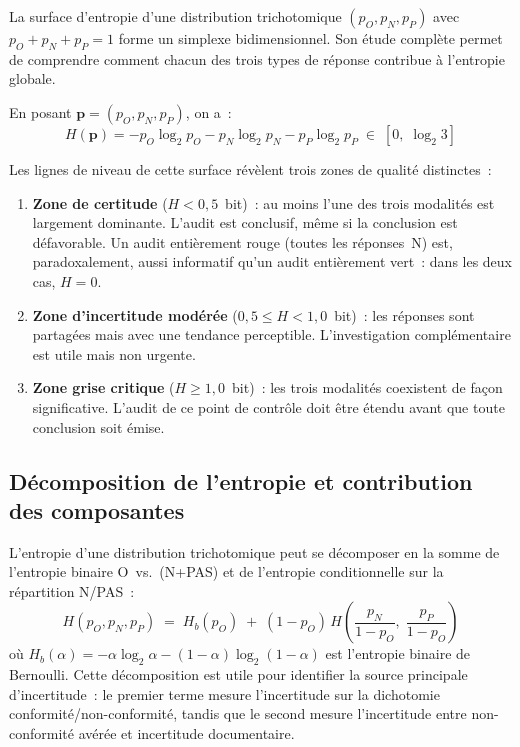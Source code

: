 La surface d'entropie d'une distribution trichotomique $(p_O, p_N, p_P)$ avec
$p_O + p_N + p_P = 1$ forme un simplexe bidimensionnel. Son étude complète
permet de comprendre comment chacun des trois types de réponse contribue à l'entropie
globale.

En posant $\mathbf{p} = (p_O, p_N, p_P)$, on a~:
\begin{equation}
  H(\mathbf{p})
    = -p_O \log_2 p_O - p_N \log_2 p_N - p_P \log_2 p_P
    \;\in\; [0,\; \log_2 3]
  \label{eq:entropie-tri}
\end{equation}

Les lignes de niveau de cette surface révèlent trois zones de qualité distinctes~:

\begin{enumerate}
  \item \textbf{Zone de certitude} ($H < 0{,}5$~bit)~: au moins l'une des trois
        modalités est largement dominante. L'audit est conclusif, même si la
        conclusion est défavorable. Un audit entièrement rouge (toutes les
        réponses~N) est, paradoxalement, aussi informatif qu'un audit entièrement
        vert~: dans les deux cas, $H = 0$.
  \item \textbf{Zone d'incertitude modérée} ($0{,}5 \leq H < 1{,}0$~bit)~:
        les réponses sont partagées mais avec une tendance perceptible.
        L'investigation complémentaire est utile mais non urgente.
  \item \textbf{Zone grise critique} ($H \geq 1{,}0$~bit)~: les trois modalités
        coexistent de façon significative. L'audit de ce point de contrôle doit
        être étendu avant que toute conclusion soit émise.
\end{enumerate}

\subsection{Décomposition de l'entropie et contribution des composantes}

L'entropie d'une distribution trichotomique peut se décomposer en la somme de
l'entropie binaire O~vs.~(N+PAS) et de l'entropie conditionnelle sur la
répartition N/PAS~:
\begin{equation}
  H(p_O, p_N, p_P) \;=\;
    H_b(p_O) \;+\; (1 - p_O)\,H\!\left(\frac{p_N}{1-p_O},\;
    \frac{p_P}{1-p_O}\right)
  \label{eq:decomp}
\end{equation}
où $H_b(\alpha) = -\alpha \log_2 \alpha - (1-\alpha)\log_2(1-\alpha)$ est
l'entropie binaire de Bernoulli. Cette décomposition est utile pour identifier
la source principale d'incertitude~: le premier terme mesure l'incertitude sur la
dichotomie conformité/non-conformité, tandis que le second mesure l'incertitude
entre non-conformité avérée et incertitude documentaire.

